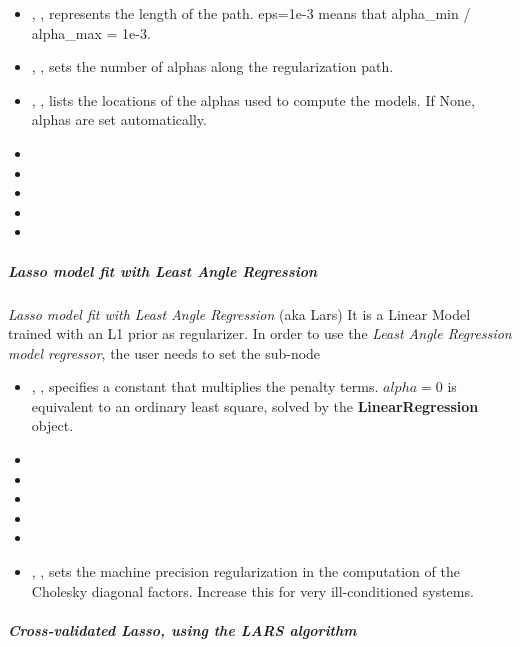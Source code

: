\begin{itemize}
  \item {}, , represents the length of
  the path.
  eps=1e-3 means that alpha\_min / alpha\_max = 1e-3.
  \item {}, , sets the number of
  alphas along the regularization path.
  \item {}, , lists the
  locations of the alphas used to compute the models.
  If None, alphas are set automatically.
  \item {}
  \item {}
  \item {}
  \item {}
  \item {}
\end{itemize}
\subparagraph{Lasso model fit with Least Angle Regression}
\mbox{}

\textit{Lasso model fit with Least Angle Regression} (aka Lars)
It is a Linear Model trained with an L1 prior as regularizer.
In order to use the \textit{Least Angle Regression model regressor}, the user needs to set the sub-node
%

\begin{itemize}
  \item {}, , specifies a constant
  that multiplies the penalty terms.
  $alpha = 0$ is equivalent to an ordinary least square, solved by the
  \textbf{LinearRegression} object.
  \item {}
  \item {}
  \item {}
  \item {}
  \item {}
  \item {}, , sets the machine
  precision regularization in the computation of the Cholesky diagonal factors.
  Increase this for very ill-conditioned systems.
\end{itemize}
\subparagraph{Cross-validated Lasso, using the LARS algorithm}
\mbox{}

